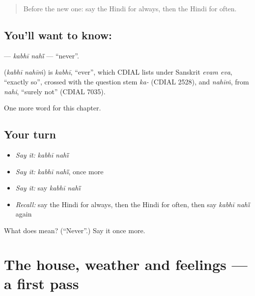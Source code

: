 \begin{quote}
Before the new one: say the Hindi for always, then the Hindi for often.
\end{quote}

\subsection*{You'll want to know:  }
\textbf{ } — \emph{kabhī nahī̃} — \textquotedblleft{}never\textquotedblright{}.

\begin{cousinweb}
\textbf{ } (\emph{kabhī nahīṁ}) is \emph{kabhī}, \textquotedblleft{}ever\textquotedblright{}, which CDIAL lists under Sanskrit \emph{evam eva}, \textquotedblleft{}exactly so\textquotedblright{}, crossed with the question stem \emph{ka-} (CDIAL 2528), and \emph{nahīṁ}, from \emph{nahi}, \textquotedblleft{}surely not\textquotedblright{} (CDIAL 7035).
\end{cousinweb}

\begin{grammarlens}[title={What you've built}]
One more word for this chapter.
\end{grammarlens}

\subsection*{Your turn}
\begin{itemize}
\raggedright
  \item \emph{Say it:} \emph{kabhī nahī̃}
  \item \emph{Say it:} \emph{kabhī nahī̃}, once more
  \item \emph{Say it:} say \emph{kabhī nahī̃}
  \item \emph{Recall:} say the Hindi for always, then the Hindi for often, then say \emph{kabhī nahī̃} again
\end{itemize}

\begin{tcolorbox}[breakable,colback=teal!4,colframe=teal!35!black,title={Before you move on}]
What does   mean? (\textquotedblleft{}Never\textquotedblright{}.) Say it once more.
\end{tcolorbox}
\section[(dialogue)]{The house, weather and feelings — a first pass}

